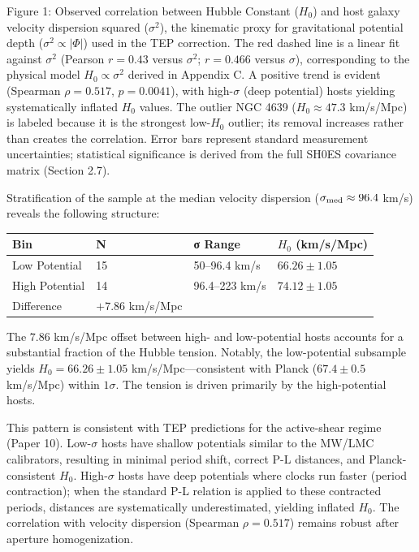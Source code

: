 \documentclass[
]{article}
\newcounter{none} %
\begin{document}
Figure 1: Observed correlation between Hubble Constant (\(H_0\)) and
host galaxy velocity dispersion squared (\(\sigma^2\)), the kinematic
proxy for gravitational potential depth (\(\sigma^2 \propto |\Phi|\))
used in the TEP correction. The red dashed line is a linear fit against
\(\sigma^2\) (Pearson \(r=0.43\) versus \(\sigma^2\); \(r=0.466\) versus
\(\sigma\)), corresponding to the physical model
\(H_0 \propto \sigma^2\) derived in Appendix C. A positive trend is
evident (Spearman \(\rho=0.517\), \(p=0.0041\)), with high-\(\sigma\)
(deep potential) hosts yielding systematically inflated \(H_0\) values.
The outlier NGC 4639 (\(H_0 \approx 47.3\) km/s/Mpc) is labeled because
it is the strongest low-\(H_0\) outlier; its removal increases rather
than creates the correlation. Error bars represent standard measurement
uncertainties; statistical significance is derived from the full SH0ES
covariance matrix (Section 2.7).

Stratification of the sample at the median velocity dispersion
(\(\sigma_{\rm
med} \approx 96.4\) km/s) reveals the following structure:

{\def\LTcaptype{none} %
\begin{longtable}[]{@{}llll@{}}
\toprule\noalign{}
Bin & N & σ Range & \(H_0\) (km/s/Mpc) \\
\midrule\noalign{}
\endhead
\bottomrule\noalign{}
\endlastfoot
Low Potential & 15 & 50--96.4 km/s & \(66.26 \pm 1.05\) \\
High Potential & 14 & 96.4--223 km/s & \(74.12 \pm 1.05\) \\
Difference & \(+7.86\) km/s/Mpc & & \\
\end{longtable}
}

The \(7.86\) km/s/Mpc offset between high- and low-potential hosts
accounts for a substantial fraction of the Hubble tension. Notably, the
low-potential subsample yields \(H_0 = 66.26 \pm 1.05\)
km/s/Mpc---consistent with Planck (\(67.4 \pm 0.5\) km/s/Mpc) within
\(1\sigma\). The tension is driven primarily by the high-potential
hosts.

This pattern is consistent with TEP predictions for the active-shear
regime (Paper 10). Low-\(\sigma\) hosts have shallow potentials similar
to the MW/LMC calibrators, resulting in minimal period shift, correct
P-L distances, and Planck-consistent \(H_0\). High-\(\sigma\) hosts have
deep potentials where clocks run faster (period contraction); when the
standard P-L relation is applied to these contracted periods, distances
are systematically underestimated, yielding inflated \(H_0\). The
correlation with velocity dispersion (Spearman \(\rho = 0.517\)) remains
robust after aperture homogenization.
\end{document}
